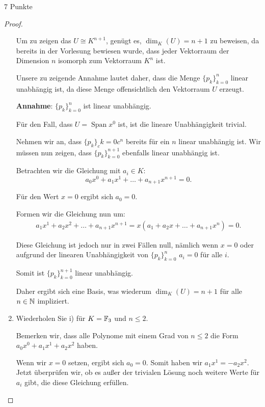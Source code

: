 \documentclass{problemset}
\begin{document}
\begin{problem}{7 Punkte}
\begin{proof}
\begin{enumerate}
              Um zu zeigen das $U \cong K^{n+1}$, genügt es, $\dim_K(U) = n +
              1$ zu beweisen, da bereits in der Vorlesung bewiesen wurde, dass
              jeder Vektorraum der Dimension $n$ isomorph zum Vektorraum $K^n$
              ist.

              Unsere zu zeigende Annahme lautet daher, dass die Menge
              $\{p_k\}_{k=0}^{n}$ linear unabhängig ist, da diese Menge
              offensichtlich den Vektorraum $U$ erzeugt.

              \textbf{Annahme}: $\{p_k\}_{k=0}^{n}$ ist linear unabhängig.

              Für den Fall, dass $U = \operatorname{Span}{x^0}$ ist, ist die
              lineare Unabhängigkeit trivial.

              Nehmen wir an, dass $\{p_k\}_ck=0c^{n}$ bereits für ein $n$
              linear unabhängig ist. Wir müssen nun zeigen, dass
              $\{p_k\}_{k=0}^{n+1}$ ebenfalls linear unabhängig ist.

              Betrachten wir die Gleichung mit $a_i \in K$:
              \[
                  a_0 x^0 + a_1 x^1 + \ldots + a_{n+1} x^{n+1} = 0.
              \]

              Für den Wert $x = 0$ ergibt sich $a_0 = 0$.

              Formen wir die Gleichung nun um:
              \begin{align}
                  a_1 x^1 + a_2 x^2 + \ldots + a_{n+1}x^{n+1} = x(a_1 + a_2 x + \ldots + a_{n+1}x^n) = 0.
              \end{align}

              Diese Gleichung ist jedoch nur in zwei Fällen null, nämlich wenn
              $x = 0$ oder aufgrund der linearen Unabhängigkeit von
              $\{p_k\}_{k=0}^{n}$ $a_i = 0$ für alle $i$.

              Somit ist $\{p_k\}_{k=0}^{n+1}$ linear unabhängig.

              Daher ergibt sich eine Basis, was wiederum $\dim_K(U) = n + 1$
              für alle $n \in \mathbb{N}$ impliziert. \checkmark

        \item Wiederholen Sie i) für $K = \mathbb{F}_3$ und $n \leq 2$.

              Bemerken wir, dass alle Polynome mit einem Grad von $n \leq 2$
              die Form $a_0x^0 + a_1x^1 + a_2x^2$ haben.

              Wenn wir $x = 0$ setzen, ergibt sich $a_0 = 0$. Somit haben wir
              $a_1x^1 = - a_2x^2$. Jetzt überprüfen wir, ob es außer der
              trivialen Lösung noch weitere Werte für $a_i$ gibt, die diese
              Gleichung erfüllen.


\end{enumerate}
\end{proof}
\end{problem}
\end{document}

